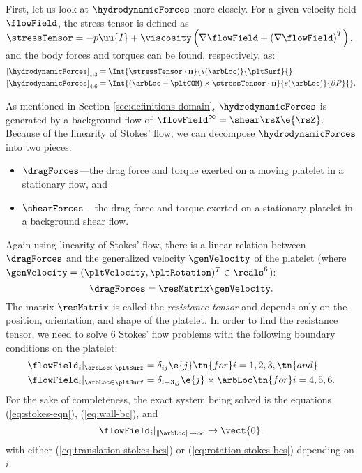 First, let us look at $\hydrodynamicForces$ more closely. For a given
velocity field $\flowField$, the stress tensor is defined as
$\stressTensor = -p \uu{I} + \viscosity \left(\nabla \flowField +
  \left(\nabla \flowField\right)^T\right)$, and the body forces and
torques can be found, respectively, as:
\begin{align}
  \left[\hydrodynamicForces\right]_{1:3} &= \Int{\stressTensor \cdot
  \mathbf{n}}{s(\arbLoc)}{\pltSurf}{} \label{eq:body-force} \\
  \left[\hydrodynamicForces\right]_{4:6} &= \Int{(\arbLoc - \pltCOM)
  \times \stressTensor \cdot \mathbf{n}}{s(\arbLoc)}{\partial
  P}{}. \label{eq:body-torque} 
\end{align}

As mentioned in Section \ref{sec:definitions-domain},
$\hydrodynamicForces$ is generated by a background flow of
$\flowField^\infty = \shear \rsX \e{\rsZ}$. Because of the linearity
of Stokes' flow, we can decompose $\hydrodynamicForces$ into two
pieces:
\begin{itemize}
\item $\dragForces$---the drag force and torque exerted on a moving
  platelet in a stationary flow, and
\item $\shearForces$---the drag force and torque exerted on a
  stationary platelet in a background shear flow.
\end{itemize}
Again using linearity of Stokes' flow, there is a linear relation
between $\dragForces$ and the generalized velocity $\genVelocity$ of
the platelet (where
$\genVelocity = (\pltVelocity, \pltRotation)^T \in \reals^6$):
\begin{equation}
  \label{eq:resistance-matrix}
  \dragForces = \resMatrix \genVelocity.
\end{equation}
The matrix $\resMatrix$ is called the \emph{resistance tensor} and
depends only on the position, orientation, and shape of the
platelet. In order to find the resistance tensor, we need to solve 6
Stokes' flow problems with the following boundary conditions on the
platelet:
\begin{align}
  \flowField_i |_{\arbLoc \in \pltSurf} &= \delta_{ij} \e{j} \tn{
  for } i = 1, 2, 3, \tn{ and} \label{eq:translation-stokes-bcs} \\
  \flowField_i |_{\arbLoc \in \pltSurf} &= \delta_{i-3, j} \e{j}
  \times \arbLoc \tn{ for } i = 4, 5,
  6. \label{eq:rotation-stokes-bcs}
\end{align}
For the sake of completeness, the exact system being solved is the
equations (\ref{eq:stokes-eqn}), (\ref{eq:wall-bc}), and
\begin{equation}
  \flowField_i |_{\|\arbLoc\| \rightarrow \infty} \rightarrow
  \vect{0}. \label{eq:far-field-drag}
\end{equation}
with either (\ref{eq:translation-stokes-bcs}) or
(\ref{eq:rotation-stokes-bcs}) depending on $i$.

